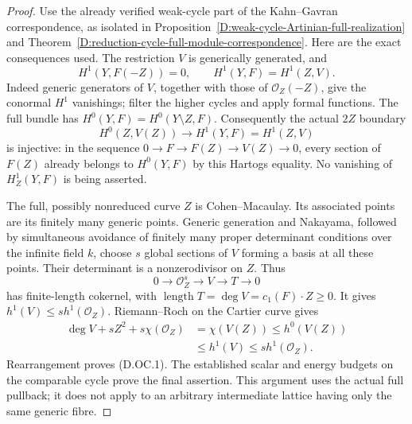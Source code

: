 \begin{proof}
Use the already verified weak-cycle part of the
Kahn--Gavran correspondence, as isolated in
Proposition~\ref{D:weak-cycle-Artinian-full-realization} and
Theorem~\ref{D:reduction-cycle-full-module-correspondence}.
Here are the exact consequences used. The restriction $V$
is generically generated, and
\[
 H^1(Y,F(-Z))=0,\qquad H^1(Y,F)=H^1(Z,V).
                                                        \tag{D.OC.2}
\]
Indeed generic generators of $V$, together with those of
$\mathcal O_Z(-Z)$, give the conormal $H^1$ vanishings;
filter the higher cycles and apply formal functions.
The full bundle has $H^0(Y,F)=H^0(Y\setminus Z,F)$.
Consequently the actual $2Z$ boundary
\[
 H^0(Z,V(Z))\longrightarrow H^1(Y,F)=H^1(Z,V)
                                                        \tag{D.OC.3}
\]
is injective: in the sequence
$0\to F\to F(Z)\to V(Z)\to0$, every section of $F(Z)$
already belongs to $H^0(Y,F)$ by this Hartogs equality.
No vanishing of $H^1_Z(Y,F)$ is being asserted.

The full, possibly nonreduced curve $Z$ is Cohen--Macaulay.
Its associated points are its finitely many generic points.
Generic generation and Nakayama, followed by simultaneous
avoidance of finitely many proper determinant conditions
over the infinite field $k$, choose $s$ global sections of
$V$ forming a basis at all these points. Their determinant
is a nonzerodivisor on $Z$. Thus
\[
 0\longrightarrow\mathcal O_Z^s\longrightarrow V
   \longrightarrow T\longrightarrow0
                                                        \tag{D.OC.4}
\]
has finite-length cokernel, with
$\operatorname{length}T=\deg V=c_1(F)\cdot Z\ge0$.
It gives $h^1(V)\le s h^1(\mathcal O_Z)$.
Riemann--Roch on the Cartier curve gives
\[
 \begin{split}
 \deg V+sZ^2+s\chi(\mathcal O_Z)
   &=\chi(V(Z))\le h^0(V(Z))\\
   &\le h^1(V)\le s h^1(\mathcal O_Z).
 \end{split}                                           \tag{D.OC.5}
\]
Rearrangement proves (D.OC.1). The established scalar and
energy budgets on the comparable cycle prove the final
assertion. This argument uses the actual full pullback;
it does not apply to an arbitrary intermediate lattice
having only the same generic fibre.
\end{proof}

